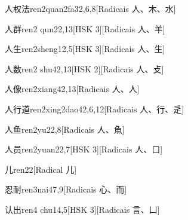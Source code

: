 \begin{entry}{人权法}{ren2quan2fa3}{2,6,8}[Radicais ⼈、⽊、⽔]
\end{entry}

\begin{entry}{人群}{ren2 qun2}{2,13}[HSK 3][Radicais ⼈、⽺]
\end{entry}

\begin{entry}{人生}{ren2sheng1}{2,5}[HSK 3][Radicais ⼈、⽣]
\end{entry}

\begin{entry}{人数}{ren2 shu4}{2,13}[HSK 2][Radicais ⼈、⽁]
\end{entry}

\begin{entry}{人像}{ren2xiang4}{2,13}[Radicais ⼈、⼈]
\end{entry}

\begin{entry}{人行道}{ren2xing2dao4}{2,6,12}[Radicais ⼈、⾏、⾡]
\end{entry}

\begin{entry}{人鱼}{ren2yu2}{2,8}[Radicais ⼈、⿂]
\end{entry}

\begin{entry}{人员}{ren2yuan2}{2,7}[HSK 3][Radicais ⼈、⼝]
\end{entry}

\begin{entry}{儿}{ren2}{2}[Radical ⼉]
\end{entry}

\begin{entry}{忍耐}{ren3nai4}{7,9}[Radicais ⼼、⽽]
\end{entry}

\begin{entry}{认出}{ren4 chu1}{4,5}[HSK 3][Radicais ⾔、⼐]
\end{entry}

